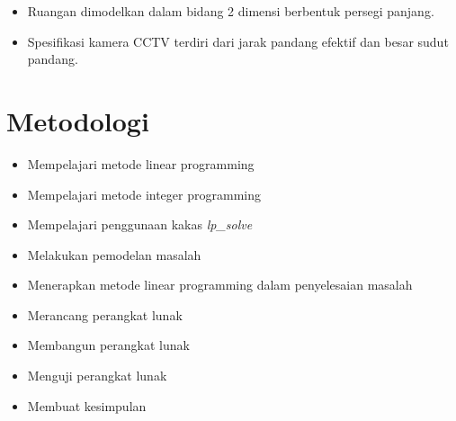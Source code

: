 \begin{itemize}
	\item Ruangan dimodelkan dalam bidang 2 dimensi berbentuk persegi panjang.
	\item Spesifikasi kamera CCTV terdiri dari jarak pandang efektif dan besar sudut pandang.
\end{itemize}

\section{Metodologi}
\label{sec:metlit}
\begin{itemize}
	\item Mempelajari metode linear programming
	\item Mempelajari metode integer programming
	\item Mempelajari penggunaan kakas \textit{lp{\_}solve}
	\item Melakukan pemodelan masalah
	\item Menerapkan metode linear programming dalam penyelesaian masalah
	\item Merancang perangkat lunak
	\item Membangun perangkat lunak
	\item Menguji perangkat lunak
	\item Membuat kesimpulan
\end{itemize}

